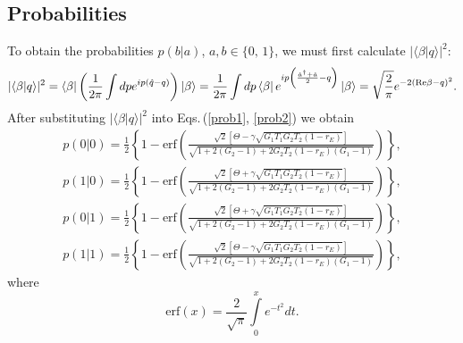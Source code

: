 \documentclass[a4paper]{article}
\begin{document}
\subsection{Probabilities}

To obtain the probabilities $p(b|a)$, $a,b\in\{0,\,1\}$, we must first calculate $|\langle\beta|q\rangle|^2$:
%
\begin{equation}
    |\langle\beta|q\rangle|^2 = \bra{\beta} \left( \frac{1}{2\pi}\int d p e^{i p(\hat{q} - q)}\right) \ket{\beta}= \frac{1}{2\pi}\int d p \bra{\beta}e^{i p\left(\frac{\hat{a}^{\dagger} + \hat{a}}{2} - q\right)}\ket{\beta}
    = \sqrt{\frac{2}{\pi}}e^{-2(\text{Re}\beta - q)^2}.
\end{equation}
%
After substituting $|\langle\beta|q\rangle|^2$ into Eqs.\,(\ref{prob1}, \ref{prob2}) we obtain 
%
\begin{equation}
\label{p00}
    \begin{gathered}
    p(0|0) =
    \frac{1}{2}\left\lbrace 1 - \text{erf}\left(\frac{\sqrt{2}\left[\Theta - \gamma\sqrt{G_1 T_1 G_2 T_2(1 - r_E)}\right]}{\sqrt{1+ 2 (G_2 - 1) + 2 G_2 T_2(1 - r_E)(G_1 - 1)}}\right)\right\rbrace,
    \end{gathered}
\end{equation}
\begin{equation}
    \begin{gathered}
    p(1| 0) =
    \frac{1}{2}\left\lbrace 1 - \text{erf}\left(\frac{\sqrt{2}\left[\Theta + \gamma\sqrt{G_1 T_1 G_2 T_2(1 - r_E)}\right]}{\sqrt{1+ 2 (G_2 - 1) + 2 G_2 T_2(1 - r_E)(G_1 - 1)}}\right)\right\rbrace,
    \end{gathered}
\end{equation}
\begin{equation}
    \begin{gathered}
    p( 0 | 1) =
    \frac{1}{2}\left\lbrace 1 - \text{erf}\left(\frac{\sqrt{2}\left[\Theta + \gamma\sqrt{G_1 T_1 G_2 T_2(1 - r_E)}\right]}{\sqrt{1+ 2 (G_2 - 1) + 2 G_2 T_2(1 - r_E)(G_1 - 1)}}\right)\right\rbrace,
    \end{gathered}
\end{equation}
\begin{equation}
\label{p11}
    \begin{gathered}
    p( 1 | 1) =
    \frac{1}{2}\left\lbrace 1 - \text{erf}\left(\frac{\sqrt{2}\left[\Theta - \gamma\sqrt{G_1 T_1 G_2 T_2(1 - r_E)}\right]}{\sqrt{1+ 2 (G_2 - 1) + 2 G_2 T_2(1 - r_E)(G_1 - 1)}}\right)\right\rbrace,
    \end{gathered}
\end{equation}
where
\begin{equation}
    \text{erf}(x) = \frac{2}{\sqrt{\pi}}\int\limits^{x}_{0} e^{-t^2} d t .
    \label{erf}
\end{equation}
\end{document}
